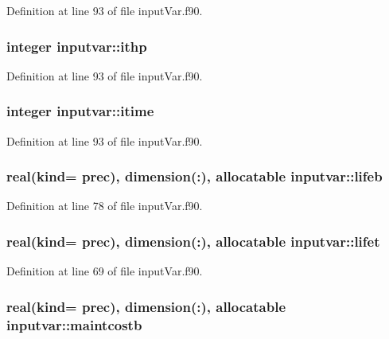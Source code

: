 Definition at line 93 of file input\-Var.\-f90.

\hypertarget{classinputvar_abb9734f3e3ee40c97881bd03881065c5}{
\subsubsection[{ithp}]{\setlength{\rightskip}{0pt plus 5cm}integer inputvar\-::ithp}}\label{classinputvar_abb9734f3e3ee40c97881bd03881065c5}


Definition at line 93 of file input\-Var.\-f90.

\hypertarget{classinputvar_a06f760a3ae10a8b9834a7e0d270d1d59}{
\subsubsection[{itime}]{\setlength{\rightskip}{0pt plus 5cm}integer inputvar\-::itime}}\label{classinputvar_a06f760a3ae10a8b9834a7e0d270d1d59}


Definition at line 93 of file input\-Var.\-f90.

\hypertarget{classinputvar_a74dcd10e62524e2f5145df13548eae82}{
\subsubsection[{lifeb}]{\setlength{\rightskip}{0pt plus 5cm}real(kind= prec), dimension(\-:), allocatable inputvar\-::lifeb}}\label{classinputvar_a74dcd10e62524e2f5145df13548eae82}


Definition at line 78 of file input\-Var.\-f90.

\hypertarget{classinputvar_a04abed47801bdfcda1ecba21b90ab85b}{
\subsubsection[{lifet}]{\setlength{\rightskip}{0pt plus 5cm}real(kind= prec), dimension(\-:), allocatable inputvar\-::lifet}}\label{classinputvar_a04abed47801bdfcda1ecba21b90ab85b}


Definition at line 69 of file input\-Var.\-f90.

\hypertarget{classinputvar_ac52f743f02f10e96c455d94c3cdc0fe8}{
\subsubsection[{maintcostb}]{\setlength{\rightskip}{0pt plus 5cm}real(kind= prec), dimension(\-:), allocatable inputvar\-::maintcostb}}\label{classinputvar_ac52f743f02f10e96c455d94c3cdc0fe8}


